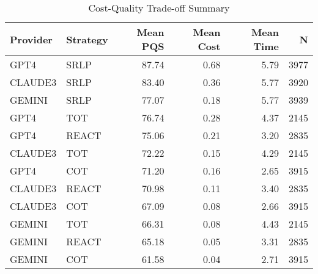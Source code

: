 \begin{table}[htbp]
\centering
\caption{Cost-Quality Trade-off Summary}
\label{tab:cost_quality}
\begin{tabular}{llrrrr}
\toprule
Provider & Strategy & Mean PQS & Mean Cost & Mean Time & N \\
\midrule
GPT4 & SRLP & 87.74 & 0.68 & 5.79 & 3977 \\
CLAUDE3 & SRLP & 83.40 & 0.36 & 5.77 & 3920 \\
GEMINI & SRLP & 77.07 & 0.18 & 5.77 & 3939 \\
GPT4 & TOT & 76.74 & 0.28 & 4.37 & 2145 \\
GPT4 & REACT & 75.06 & 0.21 & 3.20 & 2835 \\
CLAUDE3 & TOT & 72.22 & 0.15 & 4.29 & 2145 \\
GPT4 & COT & 71.20 & 0.16 & 2.65 & 3915 \\
CLAUDE3 & REACT & 70.98 & 0.11 & 3.40 & 2835 \\
CLAUDE3 & COT & 67.09 & 0.08 & 2.66 & 3915 \\
GEMINI & TOT & 66.31 & 0.08 & 4.43 & 2145 \\
GEMINI & REACT & 65.18 & 0.05 & 3.31 & 2835 \\
GEMINI & COT & 61.58 & 0.04 & 2.71 & 3915 \\
\bottomrule
\end{tabular}
\end{table}